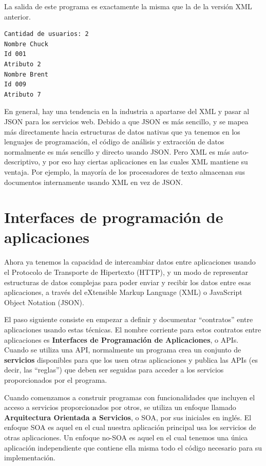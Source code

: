 La salida de este programa es exactamente la misma que la de la versión XML anterior.

\beforeverb
\begin{verbatim}
Cantidad de usuarios: 2
Nombre Chuck
Id 001
Atributo 2
Nombre Brent
Id 009
Atributo 7
\end{verbatim}
\afterverb
%
En general, hay una tendencia en la industria a apartarse del XML y pasar al JSON para
los servicios web. Debido a que JSON es más sencillo, y se mapea más directamente hacia
estructuras de datos nativas que ya tenemos en los lenguajes de programación, el código de
análisis y extracción de datos normalmente es más sencillo y directo usando JSON.
Pero XML es más auto-descriptivo, y por eso hay ciertas
aplicaciones en las cuales XML mantiene su ventaja. Por ejemplo, la mayoría de los
procesadores de texto almacenan sus documentos internamente usando XML en vez de JSON.

\section{Interfaces de programación de aplicaciones}

Ahora ya tenemos la capacidad de intercambiar datos entre aplicaciones usando el Protocolo
de Transporte de Hipertexto (HTTP), y un modo de representar estructuras de datos complejas
para poder enviar y recibir los datos entre esas aplicaciones, a través del eXtensible 
Markup Language (XML) o JavaScript Object Notation (JSON).

El paso siguiente consiste en empezar a definir y documentar ``contratos'' entre
aplicaciones usando estas técnicas. El nombre corriente para estos
contratos entre aplicaciones es {\bf Interfaces de Programación
de Aplicaciones}, o APIs. Cuando se utiliza una API, normalmente un programa
crea un conjunto de {\bf servicios} disponibles para que los usen otras aplicaciones
y publica las APIs (es decir, las ``reglas'') que deben ser seguidas para
acceder a los servicios proporcionados por el programa.

Cuando comenzamos a construir programas con funcionalidades que incluyen
el acceso a servicios proporcionados por otros,
se utiliza un enfoque llamado {\bf Arquitectura Orientada a Servicios}, o SOA, por sus
iniciales en inglés.
El enfoque SOA es aquel en el cual nuestra aplicación principal usa los servicios
de otras aplicaciones. Un enfoque no-SOA es aquel en el cual tenemos
una única aplicación independiente que contiene ella misma todo el código
necesario para su implementación.


